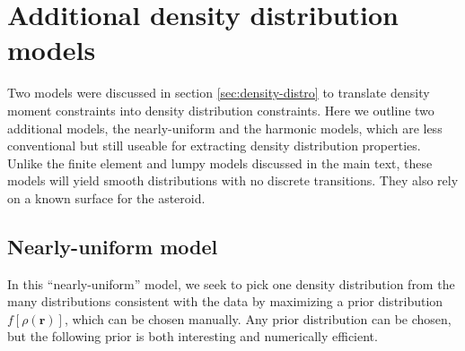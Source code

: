 \section{Additional density distribution models}
\label{app:more-models}

Two models were discussed in section \ref{sec:density-distro} to translate density moment constraints into density distribution constraints. Here we outline two additional models, the nearly-uniform and the harmonic models, which are less conventional but still useable for extracting density distribution properties. Unlike the finite element and lumpy models discussed in the main text, these models will yield smooth distributions with no discrete transitions. They also rely on a known surface for the asteroid.

\subsection{Nearly-uniform model}
In this ``nearly-uniform'' model, we seek to pick one density distribution from the many distributions consistent with the data by maximizing a prior distribution $f[\rho(\bm r)]$, which can be chosen manually. Any prior distribution can be chosen, but the following prior is both interesting and numerically efficient.

